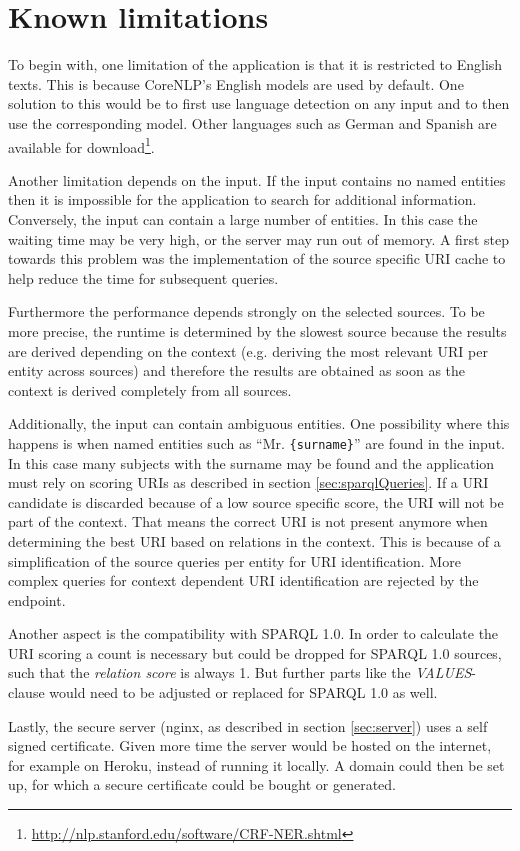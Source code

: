\newpage
\section{Known limitations}
\label{sec:Limits}
To begin with, one limitation of the application is that it is restricted to English texts. This is because CoreNLP's English models are used by default. One solution to this would be to first use language detection on any input and to then use the corresponding model. Other languages such as German and Spanish are available for download\footnote{\url{http://nlp.stanford.edu/software/CRF-NER.shtml}}. 

Another limitation depends on the input. If the input contains no named entities then it is impossible for the application to search for additional information. Conversely, the input can contain a large number of entities. In this case the waiting time may be very high, or the server may run out of memory. A first step towards this problem was the implementation of the source specific URI cache to help reduce the time for subsequent queries.

Furthermore the performance depends strongly on the selected sources. To be more precise, the runtime is determined by the slowest source because the results are derived depending on the context (e.g. deriving the most relevant URI per entity across sources) and therefore the results are obtained as soon as the context is derived completely from all sources. 

Additionally, the input can contain ambiguous entities. One possibility where this happens is when named entities such as ``Mr. \texttt{\{surname\}}'' are found in the input. In this case many subjects with the surname may be found and the application must rely on scoring URIs as described in section \ref{sec:sparqlQueries}. If a URI candidate is discarded because of a low source specific score, the URI will not be part of the context. That means the correct URI is not present anymore when determining the best URI based on relations in the context. This is because of a simplification of the source queries per entity for URI identification. More complex queries for context dependent URI identification are rejected by the endpoint.

Another aspect is the compatibility with SPARQL 1.0. In order to calculate the URI scoring a count is necessary but could be dropped for SPARQL 1.0 sources, such that the \textit{relation score} is always 1. But further parts like the \textit{VALUES}-clause would need to be adjusted or replaced for SPARQL 1.0 as well. 

Lastly, the secure server (nginx, as described in section \ref{sec:server}) uses a self signed certificate. Given more time the server would be hosted on the internet, for example on Heroku, instead of running it locally. A domain could then be set up, for which a secure certificate could be bought or generated. 




